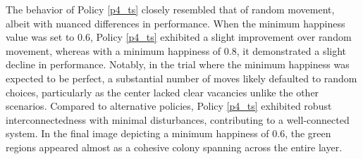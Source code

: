 \documentclass[11pt]{article}
\begin{document}
	\vspace{-2em} %
	The behavior of Policy \ref{p4_ts} closely resembled that of random movement, albeit with nuanced differences in performance. When the minimum happiness value was set to 0.6, Policy \ref{p4_ts} exhibited a slight improvement over random movement, whereas with a minimum happiness of 0.8, it demonstrated a slight decline in performance. Notably, in the trial where the minimum happiness was expected to be perfect, a substantial number of moves likely defaulted to random choices, particularly as the center lacked clear vacancies unlike the other scenarios.
	Compared to alternative policies, Policy \ref{p4_ts} exhibited robust interconnectedness with minimal disturbances, contributing to a well-connected system. In the final image depicting a minimum happiness of 0.6, the green regions appeared almost as a cohesive colony spanning across the entire layer.
\end{document}
